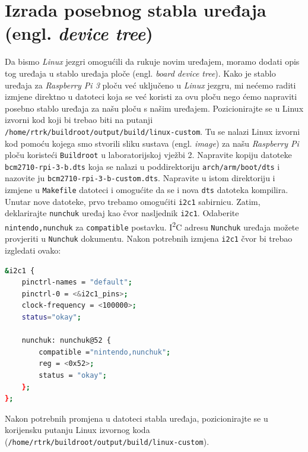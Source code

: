 \documentclass[11pt]{article}
\begin{document}
\section{Izrada posebnog stabla uređaja (engl. \textit{device tree})}
Da bismo \textit{Linux} jezgri omogućili da rukuje novim uređajem, moramo dodati
opis tog uređaja u stablo uređaja ploče (engl. \textit{board device tree}).
Kako je stablo uređaja za \textit{Raspberry Pi 3} ploču već uključeno u
\textit{Linux} jezgru, mi nećemo raditi izmjene direktno u datoteci koja se već
koristi za ovu ploču nego ćemo napraviti posebno stablo uređaja za našu ploču
s našim uređajem.
\newline
\newline
Pozicionirajte se u Linux izvorni kod koji bi trebao biti na putanji\\
\texttt{/home/rtrk/buildroot/output/build/linux-custom}. Tu se nalazi Linux
izvorni kod pomoću kojega smo stvorili sliku sustava (engl. \textit{image})
za našu \textit{Raspberry Pi} ploču koristeći \texttt{Buildroot} u laboratorijskoj
vježbi 2. Napravite kopiju datoteke \texttt{bcm2710-rpi-3-b.dts} koja se nalazi
u poddirektoriju \texttt{arch/arm/boot/dts} i nazovite ju \texttt{bcm2710-rpi-3-b-custom.dts}.
Napravite u istom direktoriju i izmjene u \texttt{Makefile} datoteci i
omogućite da se i nova \texttt{dts} datoteka kompilira.
\newline
\newline
Unutar nove datoteke, prvo trebamo omogućiti \texttt{i2c1} sabirnicu.
Zatim, deklarirajte \texttt{nunchuk} uređaj kao čvor nasljednik \texttt{i2c1}.
Odaberite \texttt{nintendo,nunchuk} za \texttt{compatible} postavku.
I\textsuperscript{2}C adresu \texttt{Nunchuk} uređaja možete provjeriti u
\texttt{Nunchuk} dokumentu.
\newline
\newline
Nakon potrebnih izmjena \texttt{i2c1} čvor bi trebao izgledati ovako:
\begin{lstlisting}[language=bash]
&i2c1 {
	pinctrl-names = "default";
	pinctrl-0 = <&i2c1_pins>;
	clock-frequency = <100000>;
	status="okay";

	nunchuk: nunchuk@52 {
		compatible ="nintendo,nunchuk";
		reg = <0x52>;
		status = "okay";
	};
};
\end{lstlisting}
Nakon potrebnih promjena u datoteci stabla uređaja, pozicionirajte se u
korijensku putanju Linux izvornog koda\\
(\texttt{/home/rtrk/buildroot/output/build/linux-custom}).\\
\end{document}
